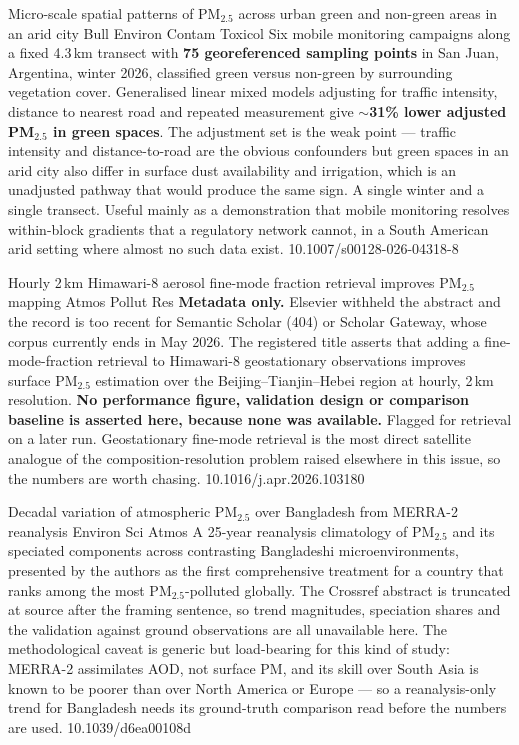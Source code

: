 \documentclass[10pt]{article}
\begin{document}

{Micro-scale spatial patterns of PM$_{2.5}$ across urban green and non-green areas in an arid city}
{Bull Environ Contam Toxicol}
{Six mobile monitoring campaigns along a fixed 4.3\,km transect with
\textbf{75 georeferenced sampling points} in San Juan, Argentina, winter 2026, classified
green versus non-green by surrounding vegetation cover. Generalised linear mixed models
adjusting for traffic intensity, distance to nearest road and repeated measurement give
\textbf{$\sim$31\% lower adjusted PM$_{2.5}$ in green spaces}. The adjustment set is the
weak point --- traffic intensity and distance-to-road are the obvious confounders but
green spaces in an arid city also differ in surface dust availability and irrigation, which
is an unadjusted pathway that would produce the same sign. A single winter and a single
transect. Useful mainly as a demonstration that mobile monitoring resolves within-block
gradients that a regulatory network cannot, in a South American arid setting where almost
no such data exist.}
{10.1007/s00128-026-04318-8}

{Hourly 2\,km Himawari-8 aerosol fine-mode fraction retrieval improves PM$_{2.5}$ mapping}
{Atmos Pollut Res}
{\textbf{Metadata only.} Elsevier withheld the abstract and the record is too recent for
Semantic Scholar (404) or Scholar Gateway, whose corpus currently ends in May 2026. The
registered title asserts that adding a fine-mode-fraction retrieval to Himawari-8
geostationary observations improves surface PM$_{2.5}$ estimation over the
Beijing--Tianjin--Hebei region at hourly, 2\,km resolution. \textbf{No performance figure,
validation design or comparison baseline is asserted here, because none was available.}
Flagged for retrieval on a later run. Geostationary fine-mode retrieval is the most direct
satellite analogue of the composition-resolution problem raised elsewhere in this issue,
so the numbers are worth chasing.}
{10.1016/j.apr.2026.103180}

{Decadal variation of atmospheric PM$_{2.5}$ over Bangladesh from MERRA-2 reanalysis}
{Environ Sci Atmos}
{A 25-year reanalysis climatology of PM$_{2.5}$ and its speciated components across
contrasting Bangladeshi microenvironments, presented by the authors as the first
comprehensive treatment for a country that ranks among the most PM$_{2.5}$-polluted
globally. The Crossref abstract is truncated at source after the framing sentence, so
trend magnitudes, speciation shares and the validation against ground observations are
all unavailable here. The methodological caveat is generic but load-bearing for this
kind of study: MERRA-2 assimilates AOD, not surface PM, and its skill over South Asia is
known to be poorer than over North America or Europe --- so a reanalysis-only trend for
Bangladesh needs its ground-truth comparison read before the numbers are used.}
{10.1039/d6ea00108d}
\end{document}
